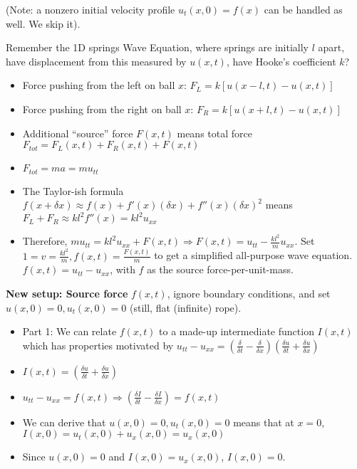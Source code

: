 \documentclass[11pt, oneside]{article}   	%
\begin{document}
\begin{itemize}
(Note: a nonzero initial velocity profile $u_t(x,0) = f(x)$ can be handled as well.  We skip it).
\end{itemize}

Remember the 1D springs Wave Equation, where springs are initially $l$ apart, have displacement from this measured by $u(x, t)$,  have Hooke's coefficient $k$?
\begin{itemize}
\item Force pushing from the left on ball $x$: $F_L = k[u(x-l,t) - u(x,t)]$
\item Force pushing from the right on ball $x$: $F_R = k[u(x+l,t) - u(x,t)]$
\item Additional ``source'' force $F(x,t)$ means total force $F_{tot} = F_L(x,t) + F_R(x,t) + F(x,t)$
\item $F_{tot} = ma = mu_{tt}$
\item The Taylor-ish formula $f(x + \delta x) \approx f(x) + f'(x)(\delta x) + f''(x)(\delta x)^2$ means $F_L + F_R \approx kl^2f''(x) = kl^2u_{xx}$
\item Therefore, $mu_{tt} = kl^2u_{xx} + F(x,t) \Rightarrow F(x,t) = u_{tt} - \frac{kl^2}{m}u_{xx}$.  Set $1 = v = \frac{kl^2}{m}, f(x,t) = 
\frac{F(x,t)}{m}$ to get a simplified all-purpose wave equation. $f(x,t) = u_{tt} - u_{xx}$, with $f$ as the source force-per-unit-mass.
\end{itemize}

\textbf{New setup: Source force} $f(x,t)$, ignore boundary conditions, and set $u(x,0) = 0, u_t(x,0) = 0$ (still, flat (infinite) rope).
\begin{itemize}
\item Part 1: We can relate $f(x,t)$ to a made-up intermediate function $I(x,t)$ which has properties motivated by $u_{tt} - u_{xx} = (\frac{\delta}{\delta t} - \frac{\delta}{\delta x})(\frac{\delta u}{\delta t} + \frac{\delta u}{\delta x})$
\item $I(x,t) = (\frac{\delta u}{\delta t} + \frac{\delta u}{\delta x})$
\item $u_{tt} - u_{xx} = f(x,t) \Rightarrow (\frac{\delta I}{\delta t} - \frac{\delta I }{\delta x}) = f(x,t)$
\item We can derive that $u(x,0) = 0, u_t(x,0) = 0$ means that at $x=0$, $I(x,0) =  u_t(x,0) +  u_x(x,0) =  u_x(x,0)$
\item Since $u(x,0) = 0$ and $I(x,0) = u_x(x,0)$, $I(x, 0 ) = 0$.
\end{itemize}
\end{document}
